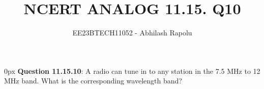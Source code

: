 \documentclass[journal,12pt,twocolumn]{IEEEtran}
\title{NCERT ANALOG 11.15. Q10}
\author{EE23BTECH11052 - Abhilash Rapolu}
\begin{document}
\maketitle
\newpage
\bigskip
\renewcommand{\thetable}{\arabic{table}}
\parindent 0px
\textbf{Question 11.15.10}:
A radio can tune in to any station in the 7.5 MHz to 12 MHz band. What is the corresponding wavelength band?
\end{document}
